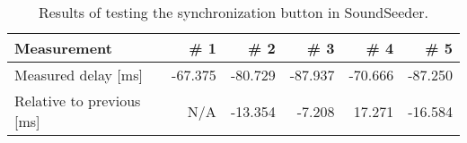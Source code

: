 \begin{table}[ht]
\centering
\begin{tabularx}{0.9\textwidth}{Xrrrrr}
\toprule
Measurement          		& \# 1    & \# 2    & \# 3    & \# 4    & \# 5    \\ \midrule
Measured delay [ms]       	& -67.375 & -80.729 & -87.937 & -70.666 & -87.250 \\
Relative to previous [ms] 	& N/A     & -13.354 & -7.208  & 17.271  & -16.584  \\ \bottomrule
\end{tabularx}
\caption{Results of testing the synchronization button in SoundSeeder.}
\label{fig:soundseedersyncbutton}
\end{table}
